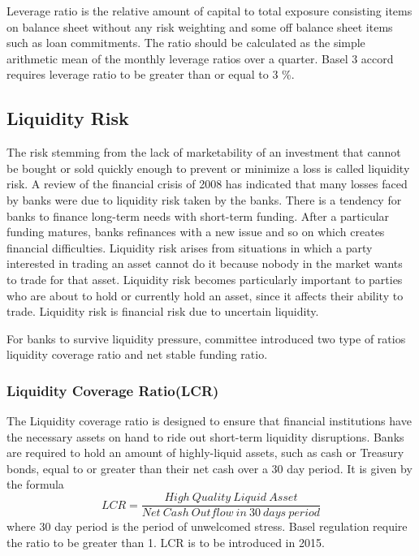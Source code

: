 \documentclass[11pt]{article}
\numberwithin{equation}{section}
\begin{document}
 Leverage ratio is the relative amount of capital to total exposure consisting items on balance sheet without any risk weighting and some off balance sheet items such as loan commitments. The ratio should be calculated as the simple arithmetic mean of the monthly leverage ratios over a quarter. Basel 3 accord requires leverage ratio to be greater than or equal to 3 \%. 

\subsection{Liquidity Risk}
\medskip

The risk stemming from the lack of marketability of an investment that cannot be bought or sold quickly enough to prevent or minimize a loss is called liquidity risk. A review of the financial crisis of 2008 has indicated that many losses faced by banks were due to liquidity risk taken by the banks. There is a tendency for banks to finance long-term needs with short-term funding. After a particular funding matures, banks refinances with a new issue and so on which creates financial difficulties. Liquidity risk arises from situations in which a party interested in trading an asset cannot do it because nobody in the market wants to trade for that asset. Liquidity risk becomes particularly important to parties who are about to hold or currently hold an asset, since it affects their ability to trade. Liquidity risk is financial risk due to uncertain liquidity. 

\hspace{1cm}For banks to survive liquidity pressure, committee introduced two type of ratios liquidity coverage ratio and net stable funding ratio.

\subsubsection{Liquidity Coverage Ratio(LCR)}
\medskip

The Liquidity coverage ratio is designed to ensure that financial institutions have the necessary assets on hand to ride out short-term liquidity disruptions. Banks are required to hold an amount of highly-liquid assets, such as cash or Treasury bonds, equal to or greater than their net cash over a 30 day period.  It is given by the formula
\[ LCR = \frac{High\: Quality\: Liquid\: Asset}{Net\: Cash\: Outflow\: in\: 30\: days\: period}\]
where 30 day period is the period of unwelcomed stress. Basel regulation require the ratio to be greater than 1. LCR is to be introduced in 2015.
\end{document}
